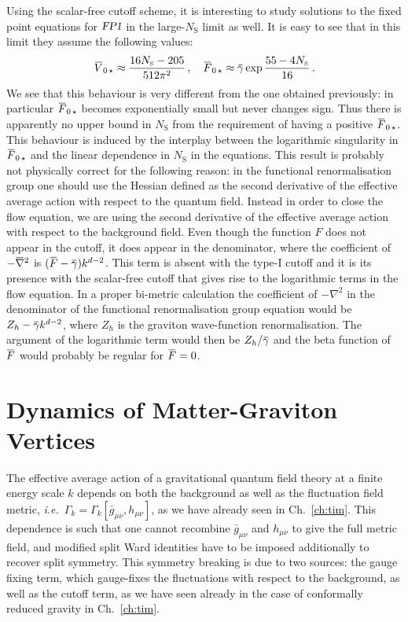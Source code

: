 \documentclass[11pt]{book}
\newcommand{\overbar}[1]{\mkern 1.5mu\overline{\mkern-1.5mu#1\mkern-1.5mu}\mkern 1.5mu}
\newcommand\NS{ N_{\scriptscriptstyle{\mathrm{S}}} }
\newcommand{\bnabla}{\overbar \nabla}
\newcommand{\FPone}  {\textsl{FP1}}
\newcommand{\bV}{\overbar V}
\newcommand{\bF}{\overbar F}
\newcommand{\bg}{\overbar \gamma}
\newcommand\ie{\textit{i.e.}\ }
\numberwithin{equation}{chapter}
\begin{document}
Using the scalar-free cutoff scheme, it is interesting to study solutions to
the fixed point equations for $\FPone$ in the large-$\NS$ limit as well.
It is easy to see that in this limit they assume the following values:
\begin{align}
  \bV_{0 \, \star} \approx \frac{ 16 \NS - 205 }{ 512 \pi^2 } \,, \quad
  \bF_{0 \, \star} \approx \bg\exp{\frac{ 55 - 4 \NS }{16}} \,.
\end{align}
We see that this behaviour is very different from the one obtained previously:
in particular $\bF_{0 \, \star}$ becomes exponentially small but never changes sign.
Thus there is apparently no upper bound in $\NS$ from the requirement of having a positive $\bF_{0 \, \star}$.
This behaviour is induced by the interplay between the logarithmic singularity
in $\bF_{0 \, \star}$ and the linear dependence in $\NS$ in the equations.
This result is probably not physically correct for the following
reason: in the functional renormalisation group one should use the Hessian defined as the second
derivative of the effective average action with respect to the quantum field.
Instead in order to close the flow equation,
we are using the second derivative of the
effective average action with respect to the background field.
Even though the function $F$ does not appear in the cutoff,
it does appear in the denominator, where the coefficient
of $-\bnabla^2$ is $(\bF-\bg) k^{d-2}$.
This term is absent with the type-I cutoff and
it is its presence with the scalar-free cutoff that gives rise
to the logarithmic terms in the flow equation.
In a proper bi-metric calculation the coefficient of
$-\nabla^2$ in the denominator of the functional renormalisation group equation
would be $Z_h-\bg k^{d-2}$, where $Z_h$ is the graviton
wave-function renormalisation.
The argument of the logarithmic term would then be $Z_h/\bg$
and the beta function of $\bF$ would probably be regular for $\bF=0$.




\chapter{Dynamics of Matter-Graviton Vertices}
\label{ch:astrid}

The effective average action of a gravitational quantum field theory
at a finite energy scale $k$
depends on both the background as well as the fluctuation field metric,
\ie $\Gamma_k = \Gamma_k[\bar{g}_{\mu \nu}, h_{\mu \nu}]$,
as we have already seen in Ch.~\ref{ch:tim}.
This dependence is such that one cannot recombine $\bar{g}_{\mu \nu}$
and $h_{\mu \nu}$ to give the full metric field,
and modified split Ward identities have to be imposed additionally
to recover split symmetry.
This symmetry breaking is due to two sources:
the gauge fixing term, which gauge-fixes the fluctuations with respect to the background,
as well as the cutoff term, as we have seen already in the case of conformally
reduced gravity in Ch.~\ref{ch:tim}.
\end{document}
